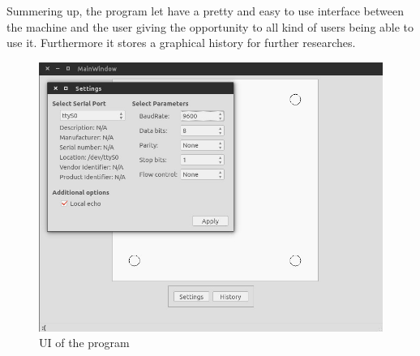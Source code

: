 		Summering up, the program let have a pretty and easy to use interface between the machine and the user giving the opportunity to all kind of users being able to use it. Furthermore it stores a graphical history for further researches.

		\begin{figure}[hb!]
			\begin{center}
				\includegraphics[width=.8\textwidth]{figures/UI}
			\end{center}
			\caption{UI of the program}
			\label{fig:ui}
		\end{figure}